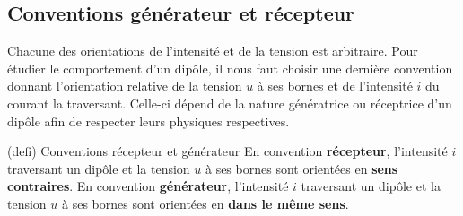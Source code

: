 \documentclass[../../main/main.tex]{subfiles}
\begin{document}
\subsection{Conventions générateur et récepteur}
Chacune des orientations de l'intensité et de la tension est arbitraire. Pour
étudier le comportement d'un dipôle, il nous faut choisir une dernière
convention donnant l'orientation relative de la tension $u$ à ses bornes et de
l'intensité $i$ du courant la traversant. Celle-ci dépend de la nature
génératrice ou réceptrice d'un dipôle afin de respecter leurs physiques
respectives.

\begin{tcb*}[label=def:convrg, sidebyside, righthand width=.3\linewidth](defi)
	{Conventions récepteur et générateur}
	En convention \textbf{récepteur}, l'intensité $i$ traversant un dipôle et la
	tension $u$ à ses bornes sont orientées en \textbf{sens contraires}.
	\bigbreak
	En convention \textbf{générateur}, l'intensité $i$ traversant un dipôle et la
	tension $u$ à ses bornes sont orientées en \textbf{dans le même sens}.
	\tcblower
	\begin{center}
\end{center}
\end{tcb*}
\end{document}
